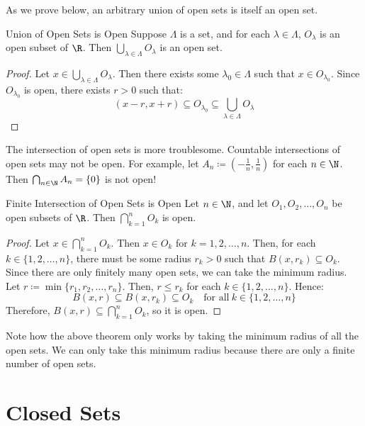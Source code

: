 As we prove below, an arbitrary union of open sets is itself an open set.

\begin{thmbox}{Union of Open Sets is Open}{}
    Suppose $\Lambda$ is a set, and for each $\lambda \in \Lambda$, $O_{\lambda}$ is an open subset of $\R$. Then $\bigcup_{\lambda \in \Lambda} O_\lambda$ is an open set.
    \tcblower
    \begin{proof}
        Let $x \in \bigcup_{\lambda \in \Lambda} O_{\lambda}$. Then there exists some $\lambda_0 \in \Lambda$ such that $x \in O_{\lambda_0}$. Since $O_{\lambda_0}$ is open, there exists $r > 0$ such that:
        \[ (x-r, x+r) \subseteq O_{\lambda_0} \subseteq \bigcup_{\lambda \in \Lambda} O_\lambda \]
    \end{proof}
\end{thmbox}

The intersection of open sets is more troublesome. Countable intersections of open sets may not be open. For example, let $A_n \coloneq \left( -\frac{1}{n}, \frac{1}{n} \right)$ for each $n \in \N$. Then $\bigcap_{n \in \N} A_n = \{0\}$ is not open!

\begin{thmbox}{Finite Intersection of Open Sets is Open}{}
    Let $n \in \N$, and let $O_1, O_2, \ldots, O_n$ be open subsets of $\R$. Then $\bigcap_{k = 1}^n O_k$ is open.
    \tcblower
    \begin{proof}
        Let $x \in \bigcap_{k = 1}^n O_k$. Then $x \in O_k$ for $k = 1,2,\ldots,n$. Then, for each $k \in \{1,2,\ldots,n\}$, there must be some radius $r_k > 0$ such that $B(x, r_k) \subseteq O_k$. Since there are only finitely many open sets, we can take the minimum radius. Let $r \coloneq \min\{r_1, r_2, \ldots, r_n\}$. Then, $r \leq r_k$ for each $k \in \{1,2,\ldots,n\}$. Hence:
        \[ B(x, r) \subseteq B(x, r_k) \subseteq O_k \quad \text{for all}\ k \in \{1,2,\ldots,n\} \]
        Therefore, $B(x,r) \subseteq \bigcap_{k = 1}^n O_k$, so it is open.
    \end{proof}
\end{thmbox}

Note how the above theorem only works by taking the minimum radius of all the open sets. We can only take this minimum radius because there are only a finite number of open sets.

\section{Closed Sets}

